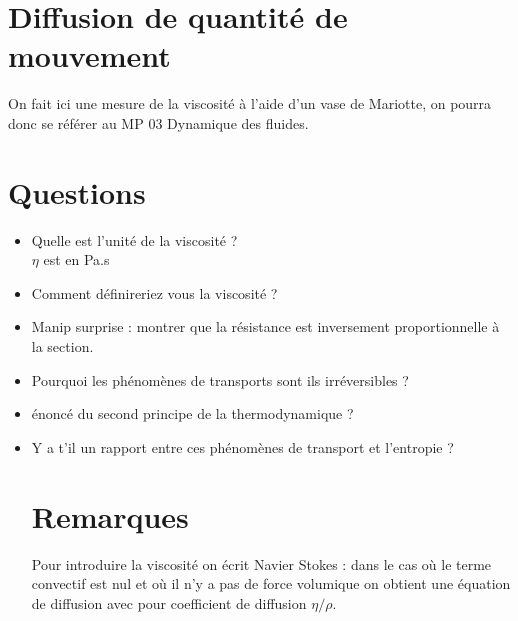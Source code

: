 \documentclass[12pt,prb,aps,epsf]{article}
\begin{document}
\section{Diffusion de quantité de mouvement}
On fait ici une mesure de la viscosité à l'aide d'un vase de Mariotte, on pourra donc se référer au MP 03 Dynamique des fluides.

\section*{Questions}
\begin{itemize}
\item Quelle est l'unité de la viscosité ?\\
$\eta$ est en Pa.s

\item Comment définireriez vous la viscosité ?

\item Manip surprise : montrer que la résistance est inversement proportionnelle à la section.

\item Pourquoi les phénomènes de transports sont ils irréversibles ?

\item énoncé du second principe de la thermodynamique ?

\item Y a t'il un rapport entre ces phénomènes de transport et l'entropie ?

\section*{Remarques}
Pour introduire la viscosité on écrit Navier Stokes : dans le cas où le terme convectif est nul et où il n'y a pas de force volumique on obtient une équation de diffusion avec pour coefficient de diffusion $\eta/\rho$.

\end{itemize}

	
\end{document}
